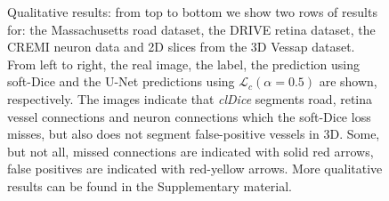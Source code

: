 \begin{figure}[ht!]
\caption{Qualitative results: from top to bottom we show two rows of results for: the Massachusetts road dataset, the DRIVE retina dataset, the CREMI neuron data and 2D slices from the 3D Vessap dataset. From left to right, the real image, the label, the prediction using soft-Dice and the U-Net predictions using $\mathcal{L}_c (\alpha=0.5)$ are shown, respectively. The images indicate that \textit{clDice} segments road, retina vessel connections and neuron connections which the soft-Dice loss misses, but also does not segment false-positive vessels in 3D. Some, but not all, missed connections are indicated with solid red arrows, false positives are indicated with red-yellow arrows. More qualitative results can be found in the Supplementary material.}
\label{road_result}
\end{figure}
